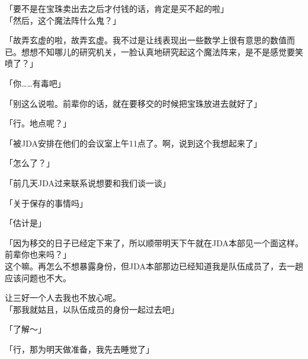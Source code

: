 「要不是在宝珠卖出去之后才付钱的话，肯定是买不起的啦」\\

「然后，这个魔法阵什么鬼？」

「故弄玄虚的啦，故弄玄虚。我不过是让线表现出一些数学上很有意思的数值而已。想想不知哪儿的研究机关，一脸认真地研究起这个魔法阵来，是不是感觉要笑喷了？」

「你……有毒吧」

「别这么说啦。前辈你的话，就在要移交的时候把宝珠放进去就好了」

「行。地点呢？」

「被JDA安排在他们的会议室上午11点了。啊，说到这个我想起来了」

「怎么了？」

「前几天JDA过来联系说想要和我们谈一谈」

「关于保存的事情吗」

「估计是」

「因为移交的日子已经定下来了，所以顺带明天下午就在JDA本部见一个面这样。前辈你也来吗？」\\

这个嘛。再怎么不想暴露身份，但JDA本部那边已经知道我是队伍成员了，去一趟应该问题也不大。

让三好一个人去我也不放心呢。\\

「那我就姑且，以队伍成员的身份一起过去吧」

「了解～」

「行，那为明天做准备，我先去睡觉了」

